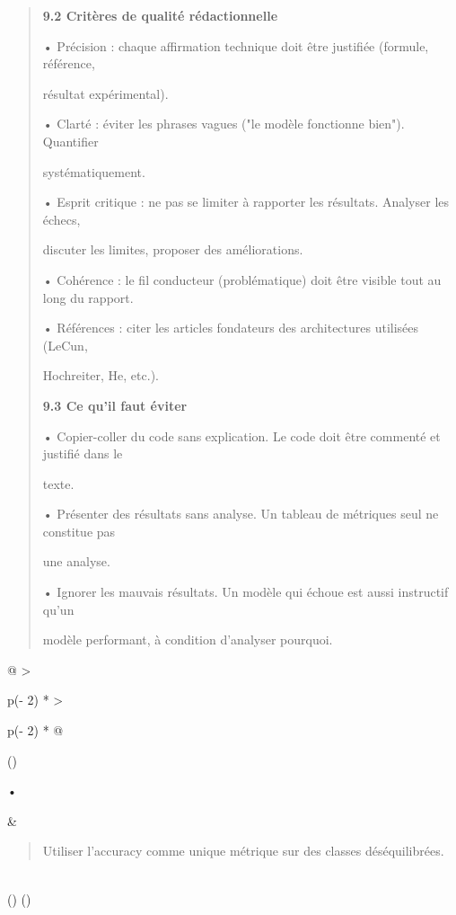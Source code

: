 \documentclass[
]{article}
\begin{document}
\begin{quote}
\textbf{9.2 Critères de qualité rédactionnelle}

• Précision : chaque affirmation technique doit être justifiée (formule,
référence,

résultat expérimental).

• Clarté : éviter les phrases vagues ("le modèle fonctionne bien").
Quantifier

systématiquement.

• Esprit critique : ne pas se limiter à rapporter les résultats.
Analyser les échecs,

discuter les limites, proposer des améliorations.

• Cohérence : le fil conducteur (problématique) doit être visible tout
au long du rapport.

• Références : citer les articles fondateurs des architectures utilisées
(LeCun,

Hochreiter, He, etc.).

\textbf{9.3 Ce qu'il faut éviter}

• Copier-coller du code sans explication. Le code doit être commenté et
justifié dans le

texte.

• Présenter des résultats sans analyse. Un tableau de métriques seul ne
constitue pas

une analyse.

• Ignorer les mauvais résultats. Un modèle qui échoue est aussi
instructif qu'un

modèle performant, à condition d'analyser pourquoi.
\end{quote}

\begin{longtable}[]{@{}
  >{\raggedright\arraybackslash}p{(\columnwidth - 2\tabcolsep) * }
  >{\raggedright\arraybackslash}p{(\columnwidth - 2\tabcolsep) * }@{}}
\toprule()
\begin{minipage}[b]{\linewidth}\raggedright
•
\end{minipage} & \begin{minipage}[b]{\linewidth}\raggedright
\begin{quote}
Utiliser l'accuracy comme unique métrique sur des classes
déséquilibrées.
\end{quote}
\end{minipage} \\
\midrule()
\endhead
\bottomrule()
\end{longtable}
\end{document}
